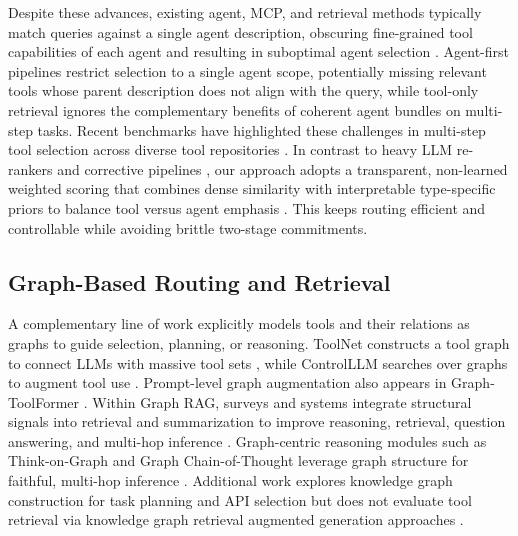 \documentclass[a4paper,twoside]{article}
\begin{document}
Despite these advances, existing agent, MCP, and retrieval methods typically match queries against a single agent description, obscuring fine-grained tool capabilities of each agent and resulting in suboptimal agent selection \cite{LiveMCPBench_eval_questions_github,lumer2025scalemcpdynamicautosynchronizingmodel}. Agent-first pipelines restrict selection to a single agent scope, potentially missing relevant tools whose parent description does not align with the query, while tool-only retrieval ignores the complementary benefits of coherent agent bundles on multi-step tasks. Recent benchmarks have highlighted these challenges in multi-step tool selection across diverse tool repositories \cite{li_api_bank_2023,qin2023toolllmfacilitatinglargelanguage,huang2024metatoolbenchmarklargelanguage}. In contrast to heavy LLM re-rankers and corrective pipelines \cite{sun_is_2023,yan_corrective_2024}, our approach adopts a transparent, non-learned weighted scoring that combines dense similarity with interpretable type-specific priors to balance tool versus agent emphasis \cite{kuzi2020leveragingsemanticlexicalmatching}. This keeps routing efficient and controllable while avoiding brittle two-stage commitments.

\subsection{Graph-Based Routing and Retrieval}
A complementary line of work explicitly models tools and their relations as graphs to guide selection, planning, or reasoning. ToolNet constructs a tool graph to connect LLMs with massive tool sets \cite{liu2024toolnetconnectinglargelanguage}, while ControlLLM searches over graphs to augment tool use \cite{liu2023controlllmaugmentlanguagemodels}. Prompt-level graph augmentation also appears in Graph-ToolFormer \cite{zhang2023graphtoolformerempowerllmsgraph}. Within Graph RAG, surveys and systems integrate structural signals into retrieval and summarization to improve reasoning, retrieval, question answering, and multi-hop inference \cite{peng2024graphretrievalaugmentedgenerationsurvey,neo4j_graphrag_2024,he2024gretrieverretrievalaugmentedgenerationtextual,edge2024localglobalgraphrag,hu2024graggraphretrievalaugmentedgeneration,sarmah2024hybridragintegratingknowledgegraphs}. Graph-centric reasoning modules such as Think-on-Graph and Graph Chain-of-Thought leverage graph structure for faithful, multi-hop inference \cite{sun2024thinkongraphdeepresponsiblereasoning,jin2024graphchainofthoughtaugmentinglarge}. Additional work explores knowledge graph construction for task planning and API selection but does not evaluate tool retrieval via knowledge graph retrieval augmented generation approaches \cite{Pan_2024,feng2024ontologygroundedautomaticknowledgegraph}.
\end{document}
